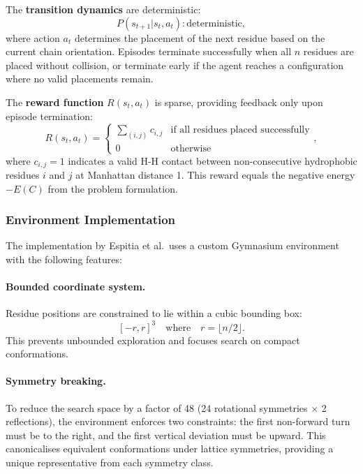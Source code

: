 \documentclass{article}
\theoremstyle{plain}
\theoremstyle{definition}
\begin{document}
The \textbf{transition dynamics} are deterministic:
\begin{equation}
P(s_{t+1} | s_t, a_t) : \text{deterministic},
\end{equation}
where action $a_t$ determines the placement of the next residue based on the current chain orientation. Episodes terminate successfully when all $n$ residues are placed without collision, or terminate early if the agent reaches a configuration where no valid placements remain.

The \textbf{reward function} $R(s_t, a_t)$ is sparse, providing feedback only upon episode termination:
\begin{equation}
R(s_t, a_t) = 
\begin{cases}
\sum_{(i,j)} c_{i,j} & \text{if all residues placed successfully} \\
0 & \text{otherwise}
\end{cases},
\end{equation}
where $c_{i,j} = 1$ indicates a valid H-H contact between non-consecutive hydrophobic residues $i$ and $j$ at Manhattan distance 1. This reward equals the negative energy $-E(C)$ from the problem formulation.

\subsubsection{Environment Implementation}

The implementation by Espitia et al.\ uses a custom Gymnasium environment with the following features:

\paragraph{Bounded coordinate system.} Residue positions are constrained to lie within a cubic bounding box:
\begin{equation}
{[-r, r]}^{3} \quad \text{where} \quad r = \lfloor n/2 \rfloor.
\end{equation}
This prevents unbounded exploration and focuses search on compact conformations.

\paragraph{Symmetry breaking.} To reduce the search space by a factor of 48 (24 rotational symmetries $\times$ 2 reflections), the environment enforces two constraints: the first non-forward turn must be to the right, and the first vertical deviation must be upward. This canonicalises equivalent conformations under lattice symmetries, providing a unique representative from each symmetry class.
\end{document}
